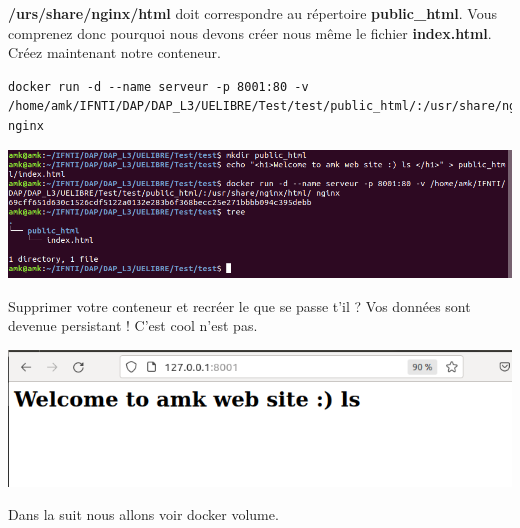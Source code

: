 \documentclass[12pt,a4paper]{article}
\begin{document}
\textbf{/urs/share/nginx/html} doit correspondre au répertoire
\textbf{public\_html}. Vous comprenez donc pourquoi nous devons 
créer nous même le fichier \textbf{index.html}. Créez maintenant
notre conteneur.
\begin{verbatim}
docker run -d --name serveur -p 8001:80 -v /home/amk/IFNTI/DAP/DAP_L3/UELIBRE/Test/test/public_html/:/usr/share/nginx/html/ nginx 
\end{verbatim}
\begin{center}
\includegraphics[scale=0.3]{img/volume_mount.png}
\end{center}
Supprimer votre conteneur et recréer le que se passe t'il ?
Vos données sont devenue persistant ! C'est cool n'est pas.
\begin{center}
\includegraphics[scale=0.3]{img/test_volume.png}
\end{center}
Dans la suit nous allons voir docker volume.
\end{document}
